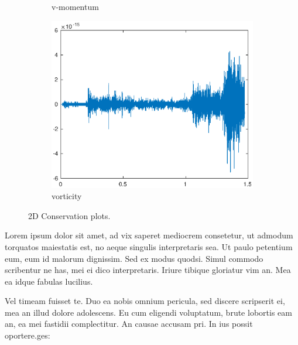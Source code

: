 \begin{figure}[htp]
\begin{subfigure}[b]{0.3\textwidth}
        \caption{v-momentum}
        \label{fig:Mass}
    \end{subfigure}
    \hfill
    \begin{subfigure}[b]{0.3\textwidth}
        \centering
        \includegraphics[width=\textwidth]{images/cons_vort.eps}\hfill
        \caption{vorticity}
        \label{Momentum}
    \end{subfigure}
     \hfill
    \caption{2D Conservation plots.}
    \label{fig:three graphs}
\end{figure}



Lorem ipsum dolor sit amet, ad vix saperet mediocrem consetetur, ut admodum torquatos maiestatis est, 
no aeque singulis interpretaris sea. Ut paulo petentium eum, eum id malorum dignissim. Sed ex modus quodsi. 
Simul commodo scribentur ne has, mei ei dico interpretaris. Iriure tibique gloriatur vim an. Mea ea idque 
fabulas lucilius.

Vel timeam fuisset te. Duo ea nobis omnium pericula, sed discere scripserit ei, mea an illud dolore adolescens.
 Eu cum eligendi voluptatum, brute lobortis eam an, ea mei fastidii complectitur. An causae accusam pri. 
 In ius possit oportere.ges: